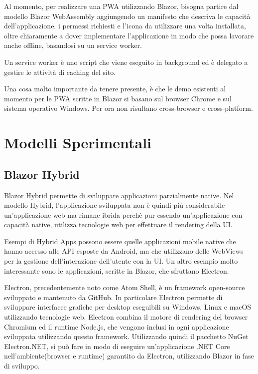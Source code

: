 Al momento, per realizzare una PWA utilizzando Blazor, bisogna partire dal modello Blazor WebAssembly aggiungendo un manifesto che descriva le capacit\`a dell'applicazione, i permessi richiesti e l'icona da utilizzare una volta installata, oltre chiaramente a dover implementare l'applicazione in modo che possa lavorare anche offline, basandosi su un service worker\cite{blazorPWA}.

Un service worker è uno script che viene eseguito in background ed è delegato a gestire le attività di caching del sito.

Una cosa molto importante da tenere presente, \`e che le demo esistenti al momento per le PWA scritte in Blazor si basano sul browser Chrome e sul sistema operativo Windows.
Per ora non risultano cross-browser e cross-platform.

\pagebreak

\section{Modelli Sperimentali}
\subsection{Blazor Hybrid}\label{sez:bhybrid}
Blazor Hybrid permette di sviluppare applicazioni parzialmente native.
Nel modello Hybrid, l'applicazione sviluppata non \`e quindi pi\`u considerabile un'applicazione web ma rimane ibrida perch\`e pur essendo un'applicazione con capacit\`a native, utilizza tecnologie web per effettuare il rendering della UI.

Esempi di Hybrid Apps possono essere quelle applicazioni mobile native che hanno accesso alle API esposte da Android, ma che utilizzano delle WebViews per la gestione dell'interazione dell'utente con la UI.
Un altro esempio molto interessante sono le applicazioni, scritte in Blazor, che sfruttano Electron.

Electron, precedentemente noto come Atom Shell, \`e un framework open-source sviluppato e mantenuto da GitHub.
In particolare Electron permette di sviluppare interfacce grafiche per desktop eseguibili su Windows, Linux e macOS utilizzando tecnologie web\cite{electronWiki}.
Electron combina il motore di rendering del browser Chromium ed il runtime Node.js, che vengono inclusi in ogni applicazione sviluppata utilizzando questo framework.
Utilizzando quindi il pacchetto NuGet Electron.NET, si pu\`o fare in modo di eseguire un'applicazione .NET Core nell'ambiente(browser e runtime) garantito da Electron, utilizzando Blazor in fase di sviluppo\cite{electronDotNet}.

